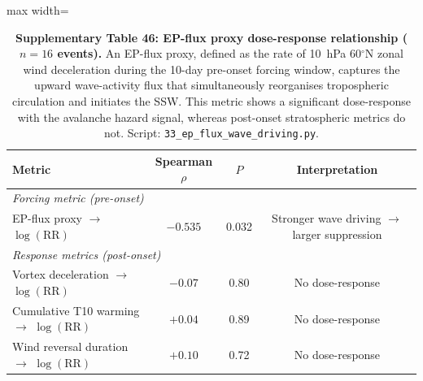 \documentclass[11pt,letterpaper]{article}
\begin{document}
\begin{table}[!ht]
\centering
\caption{\textbf{Supplementary Table 46: EP-flux proxy dose-response relationship ($n = 16$ events).} An EP-flux proxy, defined as the rate of 10~hPa 60$^\circ$N zonal wind deceleration during the 10-day pre-onset forcing window, captures the upward wave-activity flux that simultaneously reorganises tropospheric circulation and initiates the SSW. This metric shows a significant dose-response with the avalanche hazard signal, whereas post-onset stratospheric metrics do not. Script: \texttt{33\_ep\_flux\_wave\_driving.py}.}
\label{tab:ep_flux}
\small
\begin{adjustbox}{max width=\textwidth}
\begin{tabular}{lccc}
\toprule
Metric & Spearman $\rho$ & $P$ & Interpretation \\
\midrule
\multicolumn{4}{l}{\textit{Forcing metric (pre-onset)}} \\
EP-flux proxy $\to$ $\log(\mathrm{RR})$ & $-0.535$ & 0.032 & Stronger wave driving $\to$ larger suppression \\
\midrule
\multicolumn{4}{l}{\textit{Response metrics (post-onset)}} \\
Vortex deceleration $\to$ $\log(\mathrm{RR})$ & $-0.07$ & 0.80 & No dose-response \\
Cumulative T10 warming $\to$ $\log(\mathrm{RR})$ & $+0.04$ & 0.89 & No dose-response \\
Wind reversal duration $\to$ $\log(\mathrm{RR})$ & $+0.10$ & 0.72 & No dose-response \\
\bottomrule
\end{tabular}
\end{adjustbox}
\end{table}

\clearpage
\end{document}
